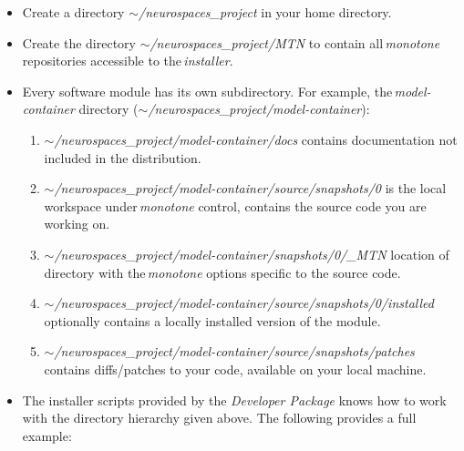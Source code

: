 \documentclass[12pt]{article}
\begin{document}
\begin{itemize}

\item Create a directory {\it $\sim$/neurospaces\_project} in your home directory.
\item Create the directory {\it $\sim$/neurospaces\_project/MTN} to contain all\,{\it monotone} repositories accessible to the\,{\it installer}.
\item Every software module has its own subdirectory. For example, the\,{\it model-container} directory ({\it $\sim$/neurospaces\_project/model-container}):

\begin{enumerate}

\item[] {\it $\sim$/neurospaces\_project/model-container/docs} contains documentation not included in the distribution. 

\item[] {\it $\sim$/neurospaces\_project/model-container/source/snapshots/0} is the local workspace under\,{\it monotone} control, contains the source code you are working on. 

\item[] {\it $\sim$/neurospaces\_project/model-container/snapshots/0/\_MTN} location of directory with the\,{\it monotone} options specific to the source code.

\item[] {\it $\sim$/neurospaces\_project/model-container/source/snapshots/0/installed} optionally contains a locally installed version of the module.

\item[] {\it $\sim$/neurospaces\_project/model-container/source/snapshots/patches} contains diffs/patches to your code, available on your local machine.

\end{enumerate}

\item The installer scripts provided by the {\it Developer Package} knows how to work with the directory hierarchy given above. The following provides a full example:


\end{itemize}
\end{document}
